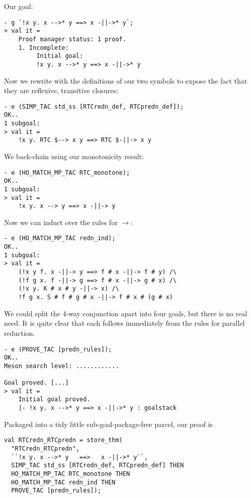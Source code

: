 Our goal:
\begin{session}\begin{verbatim}
- g `!x y. x -->* y ==> x -||->* y`;
> val it =
    Proof manager status: 1 proof.
    1. Incomplete:
         Initial goal:
         !x y. x -->* y ==> x -||->* y
\end{verbatim}\end{session}
Now we rewrite with the definitions of our two symbols to expose the
fact that they are reflexive, transitive closures:
\begin{session}\begin{verbatim}
- e (SIMP_TAC std_ss [RTCredn_def, RTCpredn_def]);
OK..
1 subgoal:
> val it =
    !x y. RTC $--> x y ==> RTC $-||-> x y
\end{verbatim}\end{session}
We back-chain using our monotonicity result:
\begin{session}\begin{verbatim}
- e (HO_MATCH_MP_TAC RTC_monotone);
OK..
1 subgoal:
> val it =
    !x y. x --> y ==> x -||-> y
\end{verbatim}\end{session}
Now we can induct over the rules for $\rightarrow$:
\begin{session}\begin{verbatim}
- e (HO_MATCH_MP_TAC redn_ind);
OK..
1 subgoal:
> val it =
    (!x y f. x -||-> y ==> f # x -||-> f # y) /\
    (!f g x. f -||-> g ==> f # x -||-> g # x) /\
    (!x y. K # x # y -||-> x) /\
    !f g x. S # f # g # x -||-> f # x # (g # x)
\end{verbatim}\end{session}
We could split the 4-way conjunction apart into four goals, but there
is no real need.  It is quite clear that each follows immediately from
the rules for parallel reduction.
\begin{session}\begin{verbatim}
- e (PROVE_TAC [predn_rules]);
OK..
Meson search level: ............

Goal proved. [...]
> val it =
    Initial goal proved.
    |- !x y. x -->* y ==> x -||->* y : goalstack
\end{verbatim}\end{session}
Packaged into a tidy little sub-goal-package-free parcel, our proof is
\begin{session}\begin{verbatim}
val RTCredn_RTCpredn = store_thm(
  "RTCredn_RTCpredn",
  ``!x y. x -->* y   ==>   x -||->* y``,
  SIMP_TAC std_ss [RTCredn_def, RTCpredn_def] THEN
  HO_MATCH_MP_TAC RTC_monotone THEN
  HO_MATCH_MP_TAC redn_ind THEN
  PROVE_TAC [predn_rules]);
\end{verbatim}\end{session}
\eos{}

